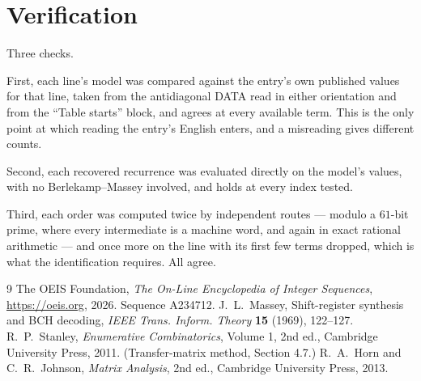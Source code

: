 \documentclass[11pt,a4paper]{article}
\theoremstyle{plain}
\theoremstyle{definition}
\begin{document}
\section{Verification}

Three checks.

First, each line's model was compared against the entry's own published values for that line,
taken from the antidiagonal DATA read in either orientation and from the ``Table starts''
block, and agrees at every available term. This is the only point at which reading the entry's
English enters, and a misreading gives different counts.

Second, each recovered recurrence was evaluated directly on the model's values, with no
Berlekamp--Massey involved, and holds at every index tested.

Third, each order was computed twice by independent routes --- modulo a $61$-bit prime, where
every intermediate is a machine word, and again in exact rational arithmetic --- and once more
on the line with its first few terms dropped, which is what the identification requires. All
agree.

\begin{thebibliography}{9}
 The OEIS Foundation, \emph{The On-Line Encyclopedia of Integer
Sequences}, \url{https://oeis.org}, 2026. Sequence A234712.
 J.~L.~Massey, Shift-register synthesis and BCH decoding, \emph{IEEE
Trans. Inform. Theory} \textbf{15} (1969), 122--127.
 R.~P.~Stanley, \emph{Enumerative Combinatorics}, Volume 1, 2nd ed.,
Cambridge University Press, 2011. (Transfer-matrix method, Section 4.7.)
 R.~A.~Horn and C.~R.~Johnson, \emph{Matrix Analysis}, 2nd ed., Cambridge
University Press, 2013.
\end{thebibliography}
\end{document}
